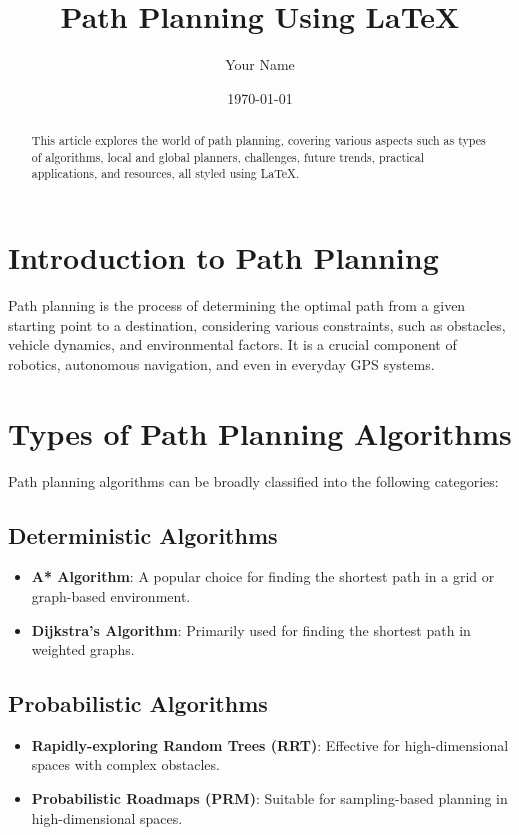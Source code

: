 \documentclass{article}
\title{Path Planning Using LaTeX}
\author{Your Name}
\date{\today}
\begin{document}
\maketitle

\begin{abstract}
    This article explores the world of path planning, covering various aspects such as types of algorithms, local and global planners, challenges, future trends, practical applications, and resources, all styled using LaTeX.
\end{abstract}

\section{Introduction to Path Planning}
Path planning is the process of determining the optimal path from a given starting point to a destination, considering various constraints, such as obstacles, vehicle dynamics, and environmental factors. It is a crucial component of robotics, autonomous navigation, and even in everyday GPS systems.

\section{Types of Path Planning Algorithms}
Path planning algorithms can be broadly classified into the following categories:

\subsection{Deterministic Algorithms}
\begin{itemize}
    \item \textbf{A* Algorithm}: A popular choice for finding the shortest path in a grid or graph-based environment.
    \item \textbf{Dijkstra's Algorithm}: Primarily used for finding the shortest path in weighted graphs.
\end{itemize}

\subsection{Probabilistic Algorithms}
\begin{itemize}
    \item \textbf{Rapidly-exploring Random Trees (RRT)}: Effective for high-dimensional spaces with complex obstacles.
    \item \textbf{Probabilistic Roadmaps (PRM)}: Suitable for sampling-based planning in high-dimensional spaces.
\end{itemize}
\end{document}
